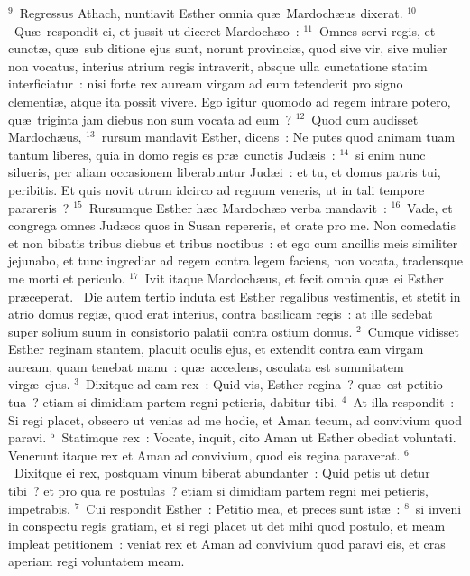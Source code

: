 ${}^{9}$~Regressus Athach, nuntiavit Esther omnia qu\ae\ Mardoch\ae us dixerat.
${}^{10}$~Qu\ae\ respondit ei, et jussit ut diceret Mardoch\ae o~:
${}^{11}$~Omnes servi regis, et cunct\ae , qu\ae\ sub ditione ejus sunt, norunt provinci\ae , quod sive vir, sive mulier non vocatus, interius atrium regis intraverit, absque ulla cunctatione statim interficiatur~: nisi forte rex auream virgam ad eum tetenderit pro signo clementi\ae , atque ita possit vivere. Ego igitur quomodo ad regem intrare potero, qu\ae\ triginta jam diebus non sum vocata ad eum~?
${}^{12}$~Quod cum audisset Mardoch\ae us,
${}^{13}$~rursum mandavit Esther, dicens~: Ne putes quod animam tuam tantum liberes, quia in domo regis es pr\ae\ cunctis Jud\ae is~:
${}^{14}$~si enim nunc silueris, per aliam occasionem liberabuntur Jud\ae i~: et tu, et domus patris tui, peribitis. Et quis novit utrum idcirco ad regnum veneris, ut in tali tempore parareris~?
${}^{15}$~Rursumque Esther h\ae c Mardoch\ae o verba mandavit~:
${}^{16}$~Vade, et congrega omnes Jud\ae os quos in Susan repereris, et orate pro me. Non comedatis et non bibatis tribus diebus et tribus noctibus~: et ego cum ancillis meis similiter jejunabo, et tunc ingrediar ad regem contra legem faciens, non vocata, tradensque me morti et periculo.
${}^{17}$~Ivit itaque Mardoch\ae us, et fecit omnia qu\ae\ ei Esther pr\ae ceperat.
~Die autem tertio induta est Esther regalibus vestimentis, et stetit in atrio domus regi\ae , quod erat interius, contra basilicam regis~: at ille sedebat super solium suum in consistorio palatii contra ostium domus.
${}^{2}$~Cumque vidisset Esther reginam stantem, placuit oculis ejus, et extendit contra eam virgam auream, quam tenebat manu~: qu\ae\ accedens, osculata est summitatem virg\ae\ ejus.
${}^{3}$~Dixitque ad eam rex~: Quid vis, Esther regina~? qu\ae\ est petitio tua~? etiam si dimidiam partem regni petieris, dabitur tibi.
${}^{4}$~At illa respondit~: Si regi placet, obsecro ut venias ad me hodie, et Aman tecum, ad convivium quod paravi.
${}^{5}$~Statimque rex~: Vocate, inquit, cito Aman ut Esther obediat voluntati. Venerunt itaque rex et Aman ad convivium, quod eis regina paraverat.
${}^{6}$~Dixitque ei rex, postquam vinum biberat abundanter~: Quid petis ut detur tibi~? et pro qua re postulas~? etiam si dimidiam partem regni mei petieris, impetrabis.
${}^{7}$~Cui respondit Esther~: Petitio mea, et preces sunt ist\ae~:
${}^{8}$~si inveni in conspectu regis gratiam, et si regi placet ut det mihi quod postulo, et meam impleat petitionem~: veniat rex et Aman ad convivium quod paravi eis, et cras aperiam regi voluntatem meam.


